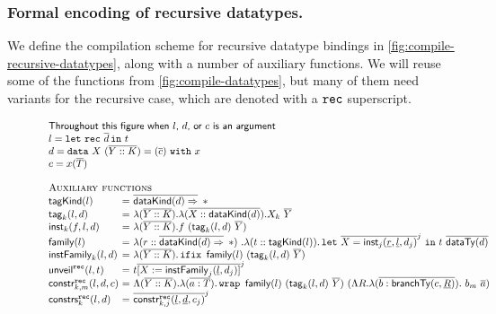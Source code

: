 \subsubsection{Formal encoding of recursive datatypes.}

We define the compilation scheme for recursive datatype bindings in
\cref{fig:compile-recursive-datatypes}, along with a number of auxiliary
functions. We will reuse some of the functions from
\cref{fig:compile-datatypes}, but many of them need variants for the
recursive case, which are denoted with a $\operatorname{\texttt{rec}}$ superscript.

\begin{figure}[!t]
  \centering
  \begin{displaymath}
  \begin{array}{l@{\ }l@{\ }l}
  \multicolumn{3}{l}{\textsf{Throughout this figure when $l$, $d$, or $c$ is an argument}}\\
  \multicolumn{3}{l}{l = \tlet\, \rec\, \seq{d} \tin\, t} \\
  \multicolumn{3}{l}{d = \datatype{X}{(\seq{Y :: K})}{x}{(\seq{c})}} \\
  \multicolumn{3}{l}{c = x(\seq{T})}\\
  \\
  \multicolumn{3}{l}{\textsc{Auxiliary functions}}\\
  \tagKind{l}
  &=& \seqKindArr{\dataKind{d}}{\Type}\\
  \dtTag{l}{d}{k}
  &=& \lambda (\seq{Y::K}) . \lambda (\seq{X :: \dataKind{d}}) . X_k\ \seq{Y}\\
  \dtInst{f}{l}{d}{k}
  &=& \lambda (\seq{Y::K}). f\ (\dtTag{l}{d}{k}\ \seq{Y})\\
  \dtFamily{l}
  &=& \lambda (r :: \seqKindArr{\dataKind{d}}{\Type})\ . \lambda (t :: \tagKind{l}) . 
  \tlet\, \seq{X = \dtInst{\fixed{r}}{\fixed{l}}{d_j}{j}}^j\, \tin\, t\  \seq{\scottTy{d}}\\
  \dtInstFinal{l}{d}{k}
  &=& \lambda (\seq{Y::K}) . \ifix\ \dtFamily{l}\ (\dtTag{l}{d}{k}\ \seq{Y})\\
  \unveilRec{l}{t}
  &=& t\seq{\subst{X}{\dtInstFinal{\fixed{l}}{d_j}{j}}}^j \\
  \constrRec{l}{d}{c}{k}{m}
  &=&\Lambda (\seq{Y::K}) . 
  \lambda (\seq{a : T}) . 
  \wrap\ \dtFamily{l}\ (\dtTag{l}{d}{k}\ \seq{Y})\
  (\Lambda R . 
  \lambda (\seq{b : \branchTy{c}{\fixed{R}}}) . 
  ~b_m ~ \seq{a})\\
  \constrsRec{l}{d}{k} &=& \seq{\constrRec{\fixed{l}}{\fixed{d}}{c_j}{k}{j}}^j\\

\end{array}
\end{displaymath}
\end{figure}

